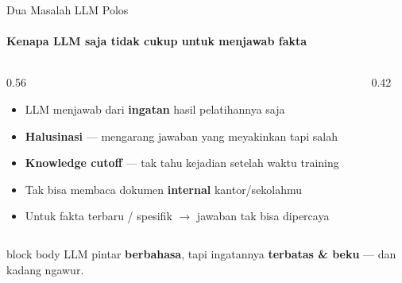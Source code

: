 \documentclass[aspectratio=169,t]{beamer}
\newcommand{\takeaway}[1]{%
  \vspace{0.3em}
  \begin{beamercolorbox}[rounded=true,shadow=false,sep=6pt]{block body}
    \centering\small\color{nvlightgreen}#1
  \end{beamercolorbox}%
}
\begin{document}
\begin{frame}{Dua Masalah LLM Polos}
  \framesubtitle{Kenapa LLM saja tidak cukup untuk menjawab fakta}
  \begin{columns}[T]
    \begin{column}{0.56\textwidth}
      \begin{itemize}
        \footnotesize
        \item LLM menjawab dari \textbf{ingatan} hasil pelatihannya saja
        \item[\textcolor{nvred}{$\bullet$}] \textbf{Halusinasi} --- mengarang jawaban yang meyakinkan tapi salah
        \item[\textcolor{nvred}{$\bullet$}] \textbf{Knowledge cutoff} --- tak tahu kejadian setelah waktu training
        \item Tak bisa membaca dokumen \textbf{internal} kantor/sekolahmu
        \item Untuk fakta terbaru / spesifik $\to$ jawaban tak bisa dipercaya
      \end{itemize}
    \end{column}
    \begin{column}{0.42\textwidth}
      \begin{center}
      \end{center}
    \end{column}
  \end{columns}
  \takeaway{LLM pintar \textbf{berbahasa}, tapi ingatannya \textbf{terbatas \& beku} --- dan kadang ngawur.}
\end{frame}
\end{document}
